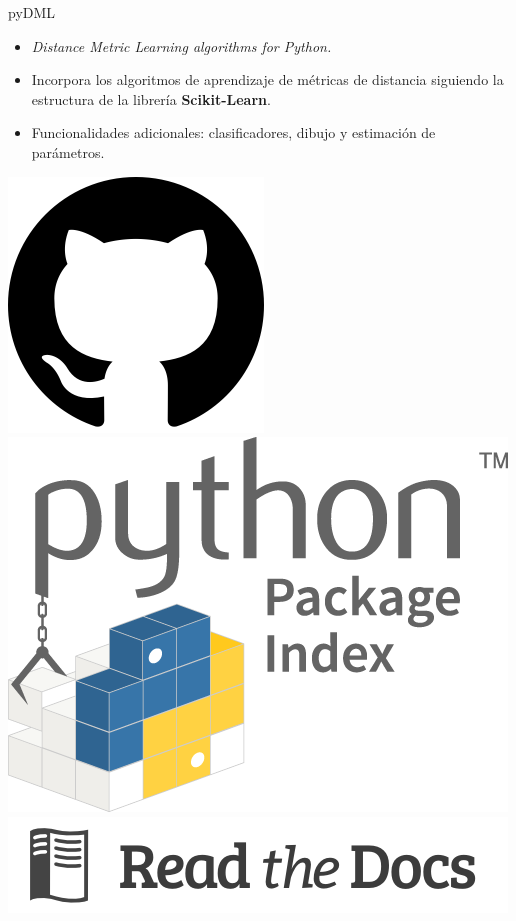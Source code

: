 \documentclass[10pt, compress]{beamer}
\begin{document}
\begin{frame}{pyDML}
  \begin{itemize}
    \item \textit{Distance Metric Learning algorithms for Python.}
    \item Incorpora los algoritmos de aprendizaje de métricas de distancia siguiendo la estructura de la librería \textbf{Scikit-Learn}.
    \item Funcionalidades adicionales: clasificadores, dibujo y estimación de parámetros.
  \end{itemize}
  \begin{center}
    \includegraphics[height=0.15\textheight]{images/github.png}
    \hspace{0.1\textwidth}
    \includegraphics[height=0.15\textheight]{images/pypi.png}
    \hspace{0.1\textwidth}
    \includegraphics[height=0.1\textheight]{images/readthedocs.png}
  \end{center}
\end{frame}
\end{document}
